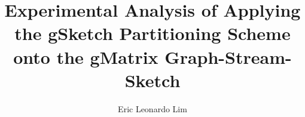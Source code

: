 \title{Experimental Analysis of Applying the gSketch Partitioning Scheme onto the gMatrix Graph-Stream-Sketch}


\author{Eric Leonardo Lim}








     



\renewcommand{\submissiontext}{Submitted in partial fulfilment of the requirements for the degree of}




\subject{Partitioning on gMatrix} 
